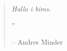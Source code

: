 
\begin{multicols}{3} 
\blindtext \\ \\

\begin{quotation} 

\noindent\normalsize\textit{Hallo i bims.}

\hfill{\Huge''}

\hfill-- Andres Minder

\end{quotation}
\end{multicols}